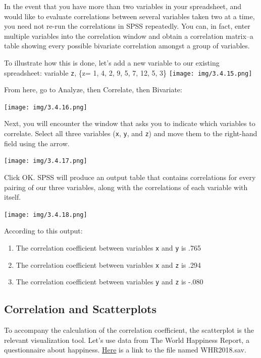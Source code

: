 \documentclass[
]{book}
\providecommand{\tightlist}{%
  \setlength{\itemsep}{0pt}\setlength{\parskip}{0pt}}
\begin{document}
In the event that you have more than two variables in your spreadsheet, and would like to evaluate correlations between several variables taken two at a time, you need not re-run the correlations in SPSS repeatedly. You can, in fact, enter multiple variables into the correlation window and obtain a correlation matrix--a table showing every possible bivariate correlation amongst a group of variables.

To illustrate how this is done, let's add a new variable to our existing spreadsheet: variable \texttt{z}, \{z= 1, 4, 2, 9, 5, 7, 12, 5, 3\}
\texttt{[image: img/3.4.15.png]}

From here, go to {Analyze}, then {Correlate}, then {Bivariate}:

\texttt{[image: img/3.4.16.png]}

Next, you will encounter the window that asks you to indicate which variables to correlate. Select all three variables (\texttt{x}, \texttt{y}, and \texttt{z}) and move them to the right-hand field using the arrow.

\texttt{[image: img/3.4.17.png]}

Click {OK}. SPSS will produce an output table that contains correlations for every pairing of our three variables, along with the correlations of each variable with itself.

\texttt{[image: img/3.4.18.png]}

According to this output:

\begin{enumerate}
\def\labelenumi{\arabic{enumi}.}
\tightlist
\item
  The correlation coefficient between variables \texttt{x} and \texttt{y} is .765
\item
  The correlation coefficient between variables \texttt{x} and \texttt{z} is .294
\item
  The correlation coefficient between variables \texttt{y} and \texttt{z} is -.080
\end{enumerate}

\hypertarget{correlation-and-scatterplots}{%
\subsection{Correlation and Scatterplots}\label{correlation-and-scatterplots}}

To accompany the calculation of the correlation coefficient, the scatterplot is the relevant visualization tool. Let's use data from The World Happiness Report, a questionnaire about happiness. \href{https://github.com/CrumpLab/statisticsLab/blob/master/data/spssdata/WHR2018.sav}{Here} is a link to the file named WHR2018.sav.
\end{document}
